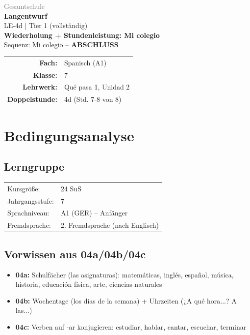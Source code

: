 \documentclass[11pt,a4paper]{article}
\newcommand{\fach}{Spanisch}
\newcommand{\jahrgangsstufe}{7}
\newcommand{\schulart}{Gesamtschule}
\newcommand{\stundenthema}{Wiederholung + Stundenleistung: Mi colegio}
\newcommand{\reihenthema}{Mi colegio}
\newcommand{\stundennummer}{4d}
\newcommand{\lehrwerk}{Qué pasa 1}
\newcommand{\lehrwerkseite}{Unidad 2}
\newcommand{\lerngruppengroesse}{24}
\begin{document}
\begin{titlepage}
    \centering
    \vspace*{2cm}
    {\large\textcolor{gray}{\schulart}}\\[2cm]
    {\Huge\textcolor{fach}{\textbf{Langentwurf}}}\\[0.5cm]
    {\large LE-\stundennummer{} | Tier 1 (vollständig)}\\[2cm]
    {\LARGE\textbf{\stundenthema}}\\[0.5cm]
    {\large Sequenz: \reihenthema{} -- \textbf{ABSCHLUSS}}\\[2cm]
    \begin{tabular}{rl}
        \textbf{Fach:} & \fach{} (A1) \\[0.3cm]
        \textbf{Klasse:} & \jahrgangsstufe \\[0.3cm]
        \textbf{Lehrwerk:} & \lehrwerk, \lehrwerkseite \\[0.3cm]
        \textbf{Doppelstunde:} & \stundennummer{} (Std. 7-8 von 8) \\[0.3cm]
    \end{tabular}
    \vfill
\end{titlepage}

\tableofcontents
\newpage

\section{Bedingungsanalyse}

\subsection{Lerngruppe}
\begin{tabular}{ll}
    Kursgröße: & \lerngruppengroesse{} SuS \\
    Jahrgangsstufe: & \jahrgangsstufe \\
    Sprachniveau: & A1 (GER) -- Anfänger \\
    Fremdsprache: & 2. Fremdsprache (nach Englisch) \\
\end{tabular}

\subsection{Vorwissen aus 04a/04b/04c}
\begin{itemize}
    \item \textbf{04a:} Schulfächer (las asignaturas): matemáticas, inglés, español, música, historia, educación física, arte, ciencias naturales
    \item \textbf{04b:} Wochentage (los días de la semana) + Uhrzeiten (¿A qué hora...? A las...)
    \item \textbf{04c:} Verben auf -ar konjugieren: estudiar, hablar, cantar, escuchar, terminar
\end{itemize}
\end{document}
